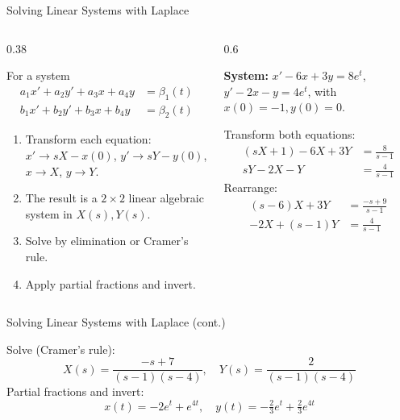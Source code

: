 \documentclass[aspectratio=169,11pt]{beamer}
\begin{document}
\begin{frame}{Solving Linear Systems with Laplace}
\footnotesize
\begin{columns}[T]
\begin{column}{0.38\textwidth}
\begin{methodbox}
For a system
\begin{align*}
a_1 x' + a_2 y' + a_3 x + a_4 y &= \beta_1(t) \\
b_1 x' + b_2 y' + b_3 x + b_4 y &= \beta_2(t)
\end{align*}
\begin{enumerate}
\item Transform each equation: $x' \to sX - x(0)$, $y' \to sY - y(0)$, $x \to X$, $y \to Y$.
\item The result is a $2\times 2$ linear algebraic system in $X(s), Y(s)$.
\item Solve by elimination or Cramer's rule.
\item Apply partial fractions and invert.
\end{enumerate}
\end{methodbox}
\end{column}
\begin{column}{0.6\textwidth}
\begin{examplebox}
\textbf{System:} $x' - 6x + 3y = 8e^t$, $y' - 2x - y = 4e^t$, with $x(0)=-1, y(0)=0$.

Transform both equations:
\begin{align*}
(sX+1) - 6X + 3Y &= \frac{8}{s-1} \\
sY - 2X - Y &= \frac{4}{s-1}
\end{align*}
Rearrange:
\begin{align*}
(s-6)X + 3Y &= \frac{-s+9}{s-1} \\
-2X + (s-1)Y &= \frac{4}{s-1}
\end{align*}
\end{examplebox}
\end{column}
\end{columns}
\end{frame}

\begin{frame}{Solving Linear Systems with Laplace (cont.)}
\footnotesize
\begin{examplebox}
Solve (Cramer's rule):
\[X(s) = \frac{-s+7}{(s-1)(s-4)}, \quad Y(s) = \frac{2}{(s-1)(s-4)}\]
Partial fractions and invert:
\[x(t) = -2e^t + e^{4t}, \quad y(t) = -\tfrac{2}{3}e^t + \tfrac{2}{3}e^{4t}\]
\end{examplebox}
\end{frame}
\end{document}
